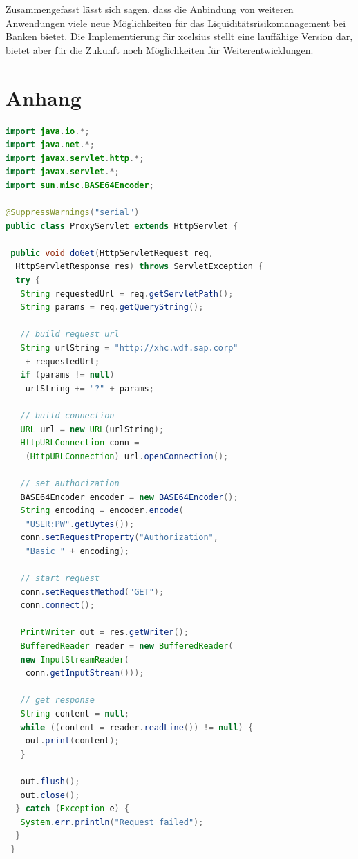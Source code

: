 \begin{onehalfspacing}
Zusammengefasst lässt sich sagen, dass die Anbindung von weiteren Anwendungen viele neue Möglichkeiten für das Liquiditätsrisikomanagement bei Banken bietet. Die Implementierung für \gls{xcelsius} stellt eine lauffähige Version dar, bietet aber für die Zukunft noch Möglichkeiten für Weiterentwicklungen.












\end{onehalfspacing}


\seAppendix{}

\setcounter{page}{8}


\chapter{Anhang}

\begin{lstlisting}[language=Java]
import java.io.*;
import java.net.*;
import javax.servlet.http.*;
import javax.servlet.*;
import sun.misc.BASE64Encoder;

@SuppressWarnings("serial")
public class ProxyServlet extends HttpServlet {

 public void doGet(HttpServletRequest req, 
  HttpServletResponse res) throws ServletException {
  try {
   String requestedUrl = req.getServletPath();
   String params = req.getQueryString();

   // build request url
   String urlString = "http://xhc.wdf.sap.corp"
    + requestedUrl;
   if (params != null)
    urlString += "?" + params;

   // build connection
   URL url = new URL(urlString);
   HttpURLConnection conn =
    (HttpURLConnection) url.openConnection();

   // set authorization
   BASE64Encoder encoder = new BASE64Encoder();
   String encoding = encoder.encode(
    "USER:PW".getBytes());
   conn.setRequestProperty("Authorization",
    "Basic " + encoding);

   // start request
   conn.setRequestMethod("GET");
   conn.connect();

   PrintWriter out = res.getWriter();
   BufferedReader reader = new BufferedReader(
   new InputStreamReader(
    conn.getInputStream()));

   // get response
   String content = null;
   while ((content = reader.readLine()) != null) {
    out.print(content);
   }

   out.flush();
   out.close();
  } catch (Exception e) {
   System.err.println("Request failed");
  }  
 }
\end{lstlisting}

